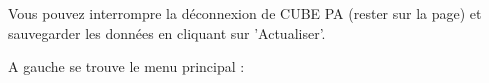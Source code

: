 \vspace{\baselineskip}

Vous pouvez interrompre la déconnexion de CUBE PA (rester sur la page) et sauvegarder les données en cliquant sur 'Actualiser'.

\vspace{\baselineskip}

\pagebreak

A gauche se trouve le menu principal :

\vspace{\baselineskip}

\begin{figure}   %
  \vspace{-35pt}      %
  \begin{center}

\end{center}
\end{figure}
